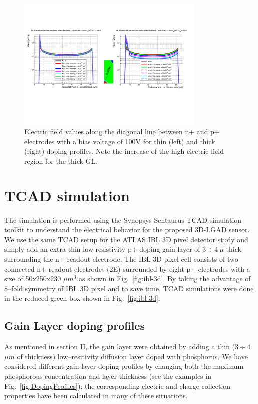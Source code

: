 \documentclass[aps,pt14,superscriptaddress,showpacs,floatfix,nofootinbib]{revtex4}
\begin{document}
\begin{figure}[hbtp]
\begin{center}
\includegraphics[width=0.80\textwidth,keepaspectratio]{figures1/ThinThickEfield.pdf}
\caption{Electric field values along the diagonal line between n+ and p+ electrodes with a bias voltage of 100V for thin (left) and thick (right) doping profiles. Note the increase of the high electric field region for the thick GL.\label{fig:efield}} 
\end{center}
\end{figure}

\section{TCAD simulation}
The simulation is performed using the Synopsys Sentaurus TCAD simulation toolkit
to understand the electrical behavior for the proposed 3D-LGAD sensor. 
We use the same TCAD setup for the ATLAS IBL 3D pixel detector study and
simply add an extra thin low-resistivity p+ doping gain layer of $3\div 4\ \mu$ thick
surrounding the n+ readout electrode. The IBL 3D pixel cell consists of two connected n+ 
readout electrodes (2E) surrounded by eight p+ electrodes with a size of 50x250x230 $\mu m^3$
as shown in Fig.~\ref{fig:ibl-3d}. By taking the advantage of 8--fold symmetry of IBL 3D pixel and to save time, TCAD simulations were done in the reduced green box shown in Fig.~\ref{fig:ibl-3d}. 

\subsection{Gain Layer doping profiles}

As mentioned in section II, the gain layer were obtained by adding a thin ($3\div 4$ $\mu m$ of thickness) low--resitivity diffusion layer doped with phosphorus. We have considered different gain layer doping profiles by changing both the maximum phosphorous concentration and layer thickness (see the examples in  Fig.~\ref{fig:DopingProfiles}); the corresponding electric and charge collection properties have been calculated in many of these situations.
\end{document}
